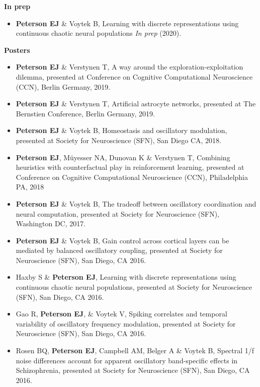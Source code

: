 \textbf{In prep}

\begin{itemize}
\tightlist
\item
  \textbf{Peterson EJ} \& Voytek B, Learning with discrete
  representations using continuous chaotic neural populations \emph{In
  prep} (2020).
\end{itemize}

\textbf{Posters}

\begin{itemize}
\item
  \textbf{Peterson EJ} \& Verstynen T, A way around the
  exploration-exploitation dilemma, presented at Conference on Cognitive
  Computational Neuroscience (CCN), Berlin Germany, 2019.
\item
  \textbf{Peterson EJ} \& Verstynen T, Artificial astrocyte networks,
  presented at The Bernstien Conference, Berlin Germany, 2019.
\item
  \textbf{Peterson EJ} \& Voytek B, Homeostasis and oscillatory
  modulation, presented at Society for Neuroscience (SFN), San Diego CA,
  2018.
\item
  \textbf{Peterson EJ}, Müyesser NA, Dunovan K \& Verstynen T, Combining
  heuristics with counterfactual play in reinforcement learning,
  presented at Conference on Cognitive Computational Neuroscience (CCN),
  Philadelphia PA, 2018
\item
  \textbf{Peterson EJ} \& Voytek B, The tradeoff between oscillatory
  coordination and neural computation, presented at Society for
  Neuroscience (SFN), Washington DC, 2017.
\item
  \textbf{Peterson EJ} \& Voytek B, Gain control across cortical layers
  can be mediated by balanced oscillatory coupling, presented at Society
  for Neuroscience (SFN), San Diego, CA 2016.
\item
  Haxby S \& \textbf{Peterson EJ}, Learning with discrete
  representations using continuous chaotic neural populations, presented
  at Society for Neuroscience (SFN), San Diego, CA 2016.
\item
  Gao R, \textbf{Peterson EJ}, \& Voytek V, Spiking correlates and
  temporal variability of oscillatory frequency modulation, presented at
  Society for Neuroscience (SFN), San Diego, CA 2016.
\item
  Rosen BQ, \textbf{Peterson EJ}, Campbell AM, Belger A \& Voytek B,
  Spectral 1/f noise differences account for apparent oscillatory
  band-specific effects in Schizophrenia, presented at Society for
  Neuroscience (SFN), San Diego, CA 2016.

\end{itemize}
